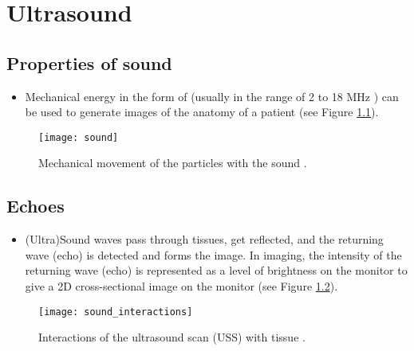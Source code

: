 \chapter{Ultrasound}

\section{Properties of sound}

\begin{itemize}
\item Mechanical energy in the form of  (usually in the range of 2 to 18 MHz
  \cite{abdulla2025sound})  can be
  used to generate images of the anatomy of a patient (see Figure
  \ref{fig:sound}).
\end{itemize}
\vspace{-2ex}
\begin{figure}[!h]
  \centering
  \texttt{[image: sound]}
  \caption{Mechanical movement of the particles with the sound
    \cite{abdulla2025properties_sound}.\label{fig:sound}}
\end{figure}

\section{Echoes}
\begin{itemize}
\item (Ultra)Sound waves pass through tissues, get reflected, and the
  returning wave (echo) is detected and forms the image. In
  imaging, the intensity of the returning wave (echo) is represented
  as a level of brightness on the monitor to give a 2D cross-sectional
  image on the monitor \cite{abdulla2025ultrasound} (see Figure
  \ref{fig:interactions}).
\end{itemize}
\vspace{-3ex}
\begin{figure}[!h]
  \centering
  \texttt{[image: sound\_interactions]}
  \caption{Interactions of the ultrasound scan (USS) with tissue
    \cite{abdulla2025properties_sound}.\label{fig:interactions}}
\end{figure}

